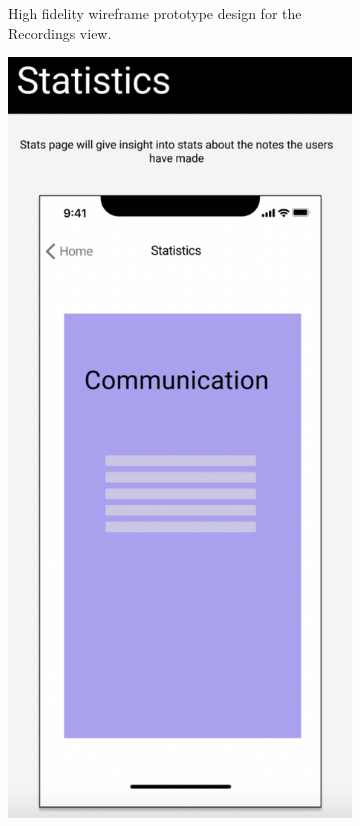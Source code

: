 \documentclass{l4proj}
\begin{document}
\begin{appendices}
\begin{figure}[H]
\begin{subfigure}[b]{0.3\textwidth}
        \caption{High fidelity wireframe prototype design for the Recordings view.}
        \label{fig:RecordingsWireframe}
    \end{subfigure} 
    \begin{subfigure}[b]{0.3\textwidth}
        \includegraphics[scale=0.3]{images/StatsWireframe.pdf}

\end{subfigure}
\end{figure}
\end{appendices}
\end{document}

